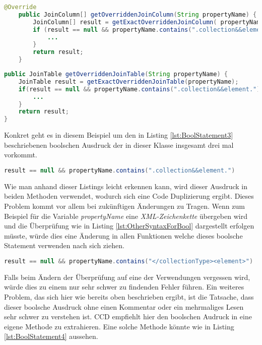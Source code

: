 \begin{lstlisting}[language=Java, caption=Komplexe boolsche Ausdrücke 1 Zeile 255 - 264, label=lst:BoolStatement1]
	@Override
	public JoinColumn[] getOverriddenJoinColumn(String propertyName) {
		JoinColumn[] result = getExactOverriddenJoinColumn( propertyName );
		if (result == null && propertyName.contains(".collection&&element.")) {
			...
		}
		return result;
	}
\end{lstlisting}

\begin{lstlisting}[language=Java, caption=Komplexe boolsche Ausdrücke 2 Zeile 305 - 313, label=lst:BoolStatement2]
public JoinTable getOverriddenJoinTable(String propertyName) {
	JoinTable result = getExactOverriddenJoinTable(propertyName);
	if(result == null && propertyName.contains(".collection&&element.")){
		...
	}
	return result;
}
\end{lstlisting}

\SuperPar Konkret geht es in diesem Beispiel um den in Listing \ref{lst:BoolStatement3} beschriebenen boolschen Ausdruck der in dieser Klasse insgesamt drei mal vorkommt.

\begin{lstlisting}[language=Java, caption=Boolscher Audruck, label=lst:BoolStatement3]
result == null && propertyName.contains(".collection&&element.")
\end{lstlisting}

\SuperPar Wie man anhand dieser Listings leicht erkennen kann, wird dieser Ausdruck in beiden Methoden verwendet, wodurch sich eine Code Duplizierung ergibt. Dieses Problem kommt vor allem bei zukünftigen Änderungen zu Tragen. Wenn zum Beispiel für die Variable \textit{propertyName} eine \textit{XML-Zeichenkette} übergeben wird und die Überprüfung wie in Listing \ref{lst:OtherSyntaxForBool} dargestellt erfolgen müsste, würde dies eine Änderung in allen Funktionen welche dieses boolsche Statement verwenden nach sich ziehen. 

\begin{lstlisting}[language=Java, caption=Boolscher Ausdruck neu, label=lst:OtherSyntaxForBool]
 result == null && propertyName.contains("</collectionType><element>")
\end{lstlisting}

\SuperPar Falls beim Ändern der Überprüfung auf eine der Verwendungen vergessen wird, würde dies zu einem nur sehr schwer zu findenden Fehler führen. Ein weiteres Problem, das sich hier wie bereits oben beschrieben ergibt, ist die Tatsache, dass dieser boolsche Ausdruck ohne einen Kommentar oder ein mehrmaliges Lesen sehr schwer zu verstehen ist. CCD empfiehlt hier den boolschen Audruck in eine eigene Methode zu extrahieren. Eine solche Methode könnte wie in Listing \ref{lst:BoolStatement4} aussehen.

